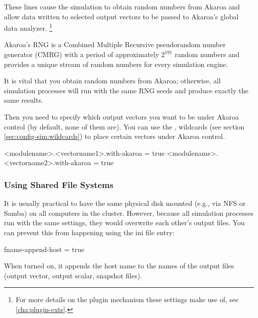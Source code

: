 These lines cause the simulation to obtain random numbers from Akaroa
and allow data written to selected output vectors to be passed to Akaroa's
global data analyzer.
    \footnote{For more details on the plugin mechanism these settings make use of,
    see \ref{cha:plugin-exts}.}

Akaroa's RNG is a Combined Multiple Recursive pseudorandom
number generator (CMRG) with a period of approximately $2^{191}$
random numbers and provides a unique stream of random numbers
for every simulation engine.

\begin{note}
It is vital that you obtain random numbers from Akaroa; otherwise,
all simulation processes will run with the same RNG seeds and
produce exactly the same results.
\end{note}

Then you need to specify which output vectors you want to
be under Akaroa control (by default, none of them are).
You can use the \ttt{*}, \ttt{**} wildcards (see
section \ref{sec:config-sim:wildcards}) to
place certain vectors under Akaroa control.

\begin{inifile}
<modulename>.<vectorname1>.with-akaroa = true
<modulename>.<vectorname2>.with-akaroa = true
\end{inifile}


\subsubsection{Using Shared File Systems}
\label{sec:run-sim:akaroa-using-shared-filesystems}

It is usually practical to have the same physical disk mounted (e.g., via NFS or
Samba) on all computers in the cluster. However, because all {\opp} simulation
processes run with the same settings, they would overwrite each other's
output files. You can prevent this from happening using the
 ini file entry:

\begin{inifile}
[General]
fname-append-host = true
\end{inifile}

When turned on, it appends the host name to the names of the output
files (output vector, output scalar, snapshot files).



